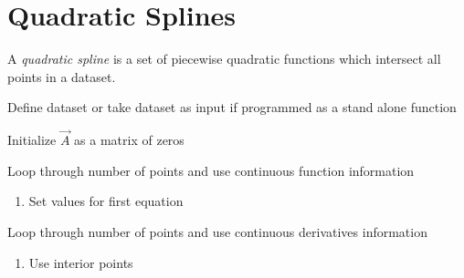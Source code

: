 \section{Quadratic Splines}

A \textit{quadratic spline} is a set of piecewise quadratic functions which intersect all points in a dataset.


\begin{pseudocode}
\item Define dataset or take dataset as input if programmed as a stand alone function
\item Initialize $\vec{A}$ as a matrix of zeros
\item Loop through number of points and use continuous function information

\begin{enumerate}
\item Set values for first equation
\end{enumerate}

\item Loop through number of points and use continuous derivatives information
\begin{enumerate}
\item Use interior points
\end{enumerate}

\end{pseudocode}